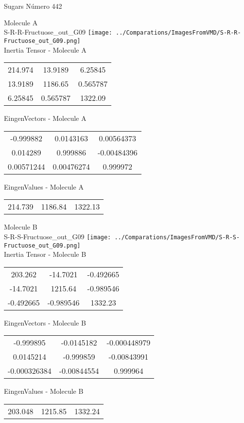 \vtab[-2cm]
\begin{center}
{\large Sugars \tab Número 442}
\end{center}
\begin{multicols}{2}
\begin{center}

Molecule A \\ 
S-R-R-Fructuose\_out\_G09
\texttt{[image: ../Comparations/ImagesFromVMD/S-R-R-Fructuose\_out\_G09.png]}
\\
Inertia Tensor - Molecule A \\
\vtab

\begin{tabular}{|c c c|}
214.974	 & 	13.9189	 & 	6.25845	 \\
13.9189	 & 	1186.65	 & 	0.565787	 \\
6.25845	 & 	0.565787	 & 	1322.09
\end{tabular}

\vtab
 EingenVectors - Molecule A     \\
\vtab
\begin{tabular}{|c c c|}
-0.999882	 & 	0.0143163	 & 	0.00564373	 \\
0.014289	 & 	0.999886	 & 	-0.00484396	 \\
0.00571244	 & 	0.00476274	 & 	0.999972
\end{tabular}

\vtab
 EingenValues - Molecule A     \\
\vtab
\begin{tabular}{|c c c|}
214.739	 & 	1186.84	 & 	1322.13	 \\
\end{tabular}
\columnbreak

Molecule B \\ 
S-R-S-Fructuose\_out\_G09
\texttt{[image: ../Comparations/ImagesFromVMD/S-R-S-Fructuose\_out\_G09.png]}
\\
Inertia Tensor - Molecule B \\
\vtab

\begin{tabular}{|c c c|}
203.262	 & 	-14.7021	 & 	-0.492665	 \\
-14.7021	 & 	1215.64	 & 	-0.989546	 \\
-0.492665	 & 	-0.989546	 & 	1332.23
\end{tabular}

\vtab
 EingenVectors - Molecule B     \\
\vtab
\begin{tabular}{|c c c|}
-0.999895	 & 	-0.0145182	 & 	-0.000448979	 \\
0.0145214	 & 	-0.999859	 & 	-0.00843991	 \\
-0.000326384	 & 	-0.00844554	 & 	0.999964
\end{tabular}

\vtab
 EingenValues - Molecule B     \\
\vtab
\begin{tabular}{|c c c|}
203.048	 & 	1215.85	 & 	1332.24	 \\
\end{tabular}

\end{center}
\end{multicols}
